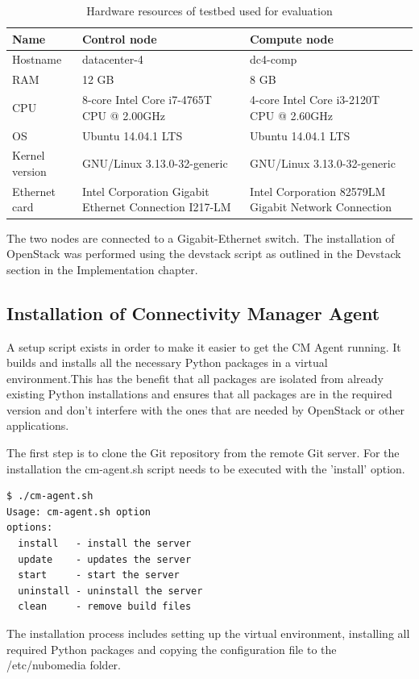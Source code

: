 \begin{table}[H]
\centering

\begin{tabularx}{\textwidth}{ |X|X|X| }
\hline Name & \textbf{Control node} & \textbf{Compute node} \\ 
\hline Hostname & datacenter-4 & dc4-comp \\ 
\hline RAM & 12 GB & 8 GB \\ 
\hline CPU & 8-core Intel Core i7-4765T CPU @ 2.00GHz & 4-core Intel Core i3-2120T CPU @ 2.60GHz \\ 
\hline OS & Ubuntu 14.04.1 LTS & Ubuntu 14.04.1 LTS \\ 
\hline Kernel version & GNU/Linux 3.13.0-32-generic & GNU/Linux 3.13.0-32-generic \\
\hline Ethernet card & Intel Corporation Gigabit Ethernet Connection I217-LM & Intel Corporation 82579LM Gigabit Network Connection \\ 
\hline 
\end{tabularx}

\caption{Hardware resources of testbed used for evaluation}
\end{table}


The two nodes are connected to a Gigabit-Ethernet switch. The installation of OpenStack was performed using the devstack script as outlined in the Devstack section in the Implementation chapter.

\subsection{Installation of Connectivity Manager Agent}

A setup script exists in order to make it easier to get the CM Agent running. It builds and installs all the necessary Python packages in a virtual environment.This has the benefit that all packages are isolated from already existing Python installations and ensures that all packages are in the required version and don't interfere with the ones that are needed by OpenStack or other applications. 

The first step is to clone the Git repository from the remote Git server. For the installation the cm-agent.sh script needs to be executed with the 'install' option.

\begin{lstlisting}[language=commands]
$ ./cm-agent.sh
Usage: cm-agent.sh option
options:
  install   - install the server
  update    - updates the server
  start     - start the server
  uninstall - uninstall the server
  clean     - remove build files
\end{lstlisting}
The installation process includes setting up the virtual environment, installing all required Python packages and copying the configuration file to the /etc/nubomedia folder.

